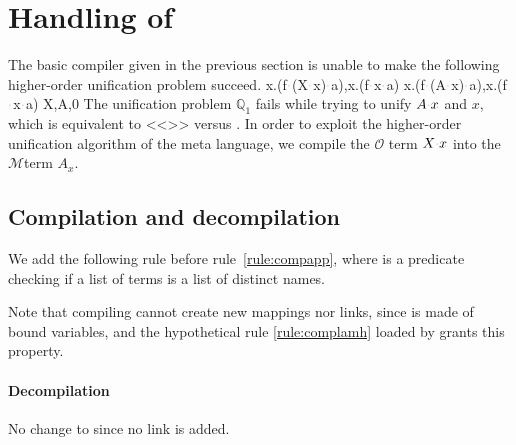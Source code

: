 \documentclass[sigconf,natbib=false,review]{acmart}
\newcommand{\appsep}{\ensuremath{\textcolor{lightgray}{\cdot}}}
\newcommand{\UnifRel}{\ensuremath{\simeq}}
\newcommand{\Uo}{\texorpdfstring{\ensuremath{\UnifRel_o}\xspace}{unif\_o}}
\newcommand{\Fo}{\texorpdfstring{\ensuremath{\mathcal{O}}\xspace}{O}}
\newcommand{\Ho}{\texorpdfstring{\ensuremath{\mathcal{M}}\xspace}{M}}
\newcommand{\hoUnifPb}{\ensuremath{\mathbb{Q}}\xspace}
\begin{document}
\section{Handling of \maybebeta}\label{sec:llam}

The basic compiler given in 
the previous section is unable to make the following
higher-order unification problem succeed.
%
\printAlllSingle
  {{{\lambda x.(f\appsep (X\appsep x)\appsep a),\lambda x.(f\appsep x\appsep a)}}}
  {{{\lambda x.(f\appsep (A\appsep x)\appsep a),\lambda x.(f\appsep x\appsep a)}}}
  {{{X,A,0}}}
  {{}}
The unification problem $\hoUnifPb_1$ fails while trying to unify
$A \appsep x$ and $x$, which is equivalent to <<>>
versus .
In order to exploit the higher-order unification algorithm of the meta language,
we %
compile the \Fo{} term $X\appsep x$ into the \Ho term $A_x$.

\subsection{Compilation and decompilation}

We add the following rule before rule~\ref{rule:compapp}, where
 is a predicate checking if a list of
terms is a list of distinct names.



\noindent
Note that compiling  cannot create new mappings nor links, since 
is made of bound variables, and the hypothetical rule 
\ref{rule:complamh}
loaded by 
grants this property.


\paragraph{Decompilation}
No change
to 
since no link is added.
\end{document}
